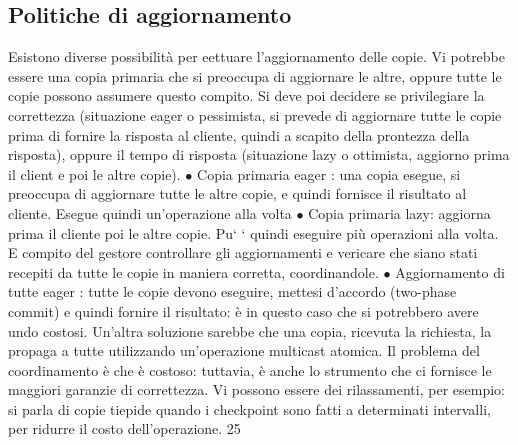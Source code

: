 \subsection{Politiche di aggiornamento}
Esistono diverse possibilità per eettuare l'aggiornamento delle copie. Vi potrebbe
essere una copia primaria che si preoccupa di aggiornare le altre, oppure tutte
le copie possono assumere questo compito. Si deve poi decidere se privilegiare
la correttezza (situazione eager o pessimista, si prevede di aggiornare tutte le
copie prima di fornire la risposta al cliente, quindi a scapito della prontezza della risposta), oppure il tempo di
risposta (situazione lazy o ottimista, aggiorno
prima il client e poi le altre copie).
$\bullet$ Copia primaria eager : una copia esegue, si preoccupa di aggiornare tutte
le altre copie, e quindi fornisce il risultato al cliente. Esegue quindi
un'operazione alla volta
$\bullet$ Copia primaria lazy: aggiorna prima il cliente poi le altre copie. Pu`
`
quindi eseguire più operazioni alla volta. E compito del gestore controllare
gli aggiornamenti e vericare che siano stati recepiti da tutte le copie in
maniera corretta, coordinandole.
$\bullet$ Aggiornamento di tutte eager : tutte le copie devono eseguire, mettesi d'accordo (two-phase commit) e quindi
fornire il risultato: è in questo caso
che si potrebbero avere undo costosi. Un'altra soluzione sarebbe che una
copia, ricevuta la richiesta, la propaga a tutte utilizzando un'operazione
multicast atomica.
Il problema del coordinamento è che è costoso: tuttavia, è anche lo strumento
che ci fornisce le maggiori garanzie di correttezza. Vi possono essere dei rilassamenti, per esempio: si parla di copie
tiepide quando i checkpoint sono fatti a
determinati intervalli, per ridurre il costo dell'operazione.
25
